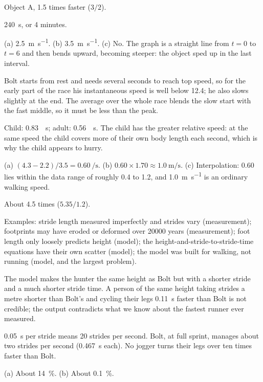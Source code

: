 \documentclass[11pt,twoside,openany]{book}
\begin{document}
\begin{description}[leftmargin=2.6em,itemsep=3pt,style=sameline]
  \item[1.15] Object A, \num{1.5} times faster ($3/2$).
  \item[1.16] \SI{240}{\second}, or \num{4} minutes.
  \item[1.17] (a) \SI{2.5}{\metre\per\second}. (b) \SI{3.5}{\metre\per\second}. (c) No. The graph is a straight line from $t=0$ to $t=6$ and then bends upward, becoming steeper: the object sped up in the last interval.
  \item[1.18] Bolt starts from rest and needs several seconds to reach top speed, so for the early part of the race his instantaneous speed is well below \num{12.4}; he also slows slightly at the end. The average over the whole race blends the slow start with the fast middle, so it must be less than the peak.
  \item[1.19] Child: \SI{0.83}{\per\second}; adult: \SI{0.56}{\per\second}. The child has the greater relative speed: at the same speed the child covers more of their own body length each second, which is why the child appears to hurry.
  \item[1.20] (a) $(4.3 - 2.2)/3.5 = \SI{0.60}{\per\second}$. (b) $0.60 \times 1.70 \approx \SI{1.0}{\metre\per\second}$. (c) Interpolation: \num{0.60} lies within the data range of roughly \num{0.4} to \num{1.2}, and \SI{1.0}{\metre\per\second} is an ordinary walking speed.
  \item[1.21] About \num{4.5} times ($5.35/1.2$).
  \item[1.22] Examples: stride length measured imperfectly and strides vary (measurement); footprints may have eroded or deformed over \num{20000} years (measurement); foot length only loosely predicts height (model); the height-and-stride-to-stride-time equations have their own scatter (model); the model was built for walking, not running (model, and the largest problem).
  \item[1.23] The model makes the hunter the same height as Bolt but with a shorter stride and a much shorter stride time. A person of the same height taking strides a metre shorter than Bolt's and cycling their legs \SI{0.11}{\second} faster than Bolt is not credible; the output contradicts what we know about the fastest runner ever measured.
  \item[1.24] \SI{0.05}{\second} per stride means \num{20} strides per second. Bolt, at full sprint, manages about two strides per second (\SI{0.467}{\second} each). No jogger turns their legs over ten times faster than Bolt.
  \item[1.25] (a) About \SI{14}{\percent}. (b) About \SI{0.1}{\percent}.

\end{description}
\end{document}
